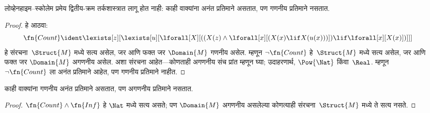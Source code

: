 \begin{thm}
\label{sol:met:lst:thm:sol-no-ls} लोव्हेनहाइम--स्कोलेम प्रमेय
द्वितीय-क्रम तर्कशास्त्रात लागू होत नाही:
काही वाक्यांना अनंत प्रतिमाने असतात,
पण गणनीय प्रतिमाने नसतात.
\end{thm}

\begin{proof}
हे आठवा:
\[\fn{Count} \ident \lexists[z][\lexists[u][\lforall[X][((X(z) \land
      \lforall[x][(X(x) \lif X(u(x)))]) \lif \lforall[x][X(x)])]]]
\]
हे संरचना~$\Struct{M}$ मध्ये सत्य असेल,
जर आणि फक्त जर $\Domain{M}$ गणनीय असेल.
म्हणून $\lnot\fn{Count}$ हे~$\Struct{M}$ मध्ये
सत्य असेल, जर आणि फक्त जर $\Domain{M}$
अगणनीय असेल. अशा संरचना
आहेत---कोणताही अगणनीय संच प्रांत
म्हणून घ्या; उदाहरणार्थ, $\Pow{\Nat}$ किंवा~$\Real$.
म्हणून $\lnot \fn{Count}$ ला अनंत प्रतिमाने
आहेत, पण गणनीय प्रतिमाने नाहीत.
\end{proof}

\begin{thm}
काही वाक्यांना गणनीय अनंत प्रतिमाने
असतात, पण अगणनीय प्रतिमाने नसतात.
\end{thm}

\begin{proof}
$\fn{Count} \land \fn{Inf}$ हे $\Nat$ मध्ये
सत्य असते; पण $\Domain{M}$ अगणनीय
असलेल्या कोणत्याही संरचना~$\Struct{M}$
मध्ये ते सत्य नसते.
\end{proof}




